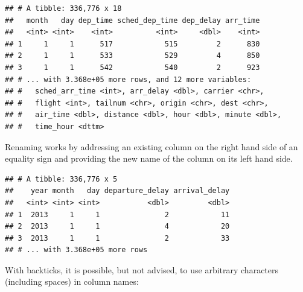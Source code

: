 \documentclass[]{book}
\newenvironment{Shaded}{}{}
\newcommand{\DataTypeTok}[1]{#1}
\newcommand{\DecValTok}[1]{#1}
\newcommand{\KeywordTok}[1]{\textcolor[rgb]{0.00,0.00,1.00}{#1}}
\newcommand{\NormalTok}[1]{#1}
\newcommand{\OperatorTok}[1]{#1}
\newcommand{\StringTok}[1]{\textcolor[rgb]{0.00,0.50,0.50}{#1}}
\begin{document}
\begin{Shaded}
\end{Shaded}

\begin{verbatim}
## # A tibble: 336,776 x 18
##   month   day dep_time sched_dep_time dep_delay arr_time
##   <int> <int>    <int>          <int>     <dbl>    <int>
## 1     1     1      517            515         2      830
## 2     1     1      533            529         4      850
## 3     1     1      542            540         2      923
## # ... with 3.368e+05 more rows, and 12 more variables:
## #   sched_arr_time <int>, arr_delay <dbl>, carrier <chr>,
## #   flight <int>, tailnum <chr>, origin <chr>, dest <chr>,
## #   air_time <dbl>, distance <dbl>, hour <dbl>, minute <dbl>,
## #   time_hour <dttm>
\end{verbatim}

Renaming works by addressing an existing column on the right hand side of an equality sign and providing the new name of the column on its left hand side.

\begin{Shaded}
\end{Shaded}

\begin{verbatim}
## # A tibble: 336,776 x 5
##    year month   day departure_delay arrival_delay
##   <int> <int> <int>           <dbl>         <dbl>
## 1  2013     1     1               2            11
## 2  2013     1     1               4            20
## 3  2013     1     1               2            33
## # ... with 3.368e+05 more rows
\end{verbatim}

With backticks, it is possible, but not advised, to use arbitrary characters (including spaces) in column names:

\begin{Shaded}
\end{Shaded}
\end{document}
